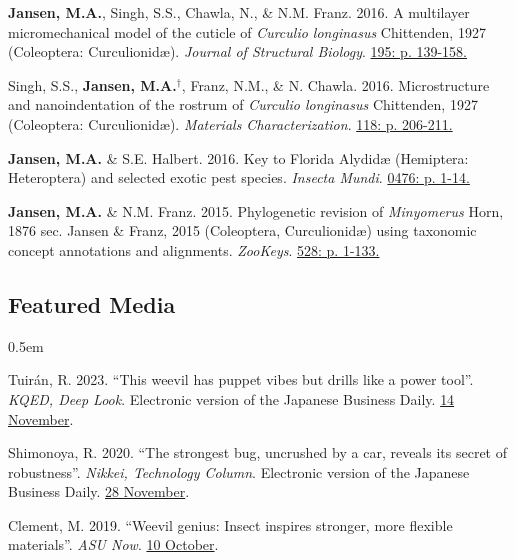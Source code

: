 \documentclass[12pt,a4paper]{article}
\begin{document}
\begin{description}
		\item \textbf{Jansen, M.A.}, Singh, S.S., Chawla, N., \& N.M. Franz. 2016. A multilayer micromechanical model of the cuticle of \textit{Curculio longinasus} Chittenden, 1927 (Coleoptera: Curculionid\ae). \textit{Journal of Structural Biology}. \href{http://www.sciencedirect.com/science/article/pii/S1047847716300922}{195: p. 139-158.}
		
		\item Singh, S.S., \textbf{Jansen, M.A.}$^\dagger$, Franz, N.M., \& N. Chawla. 2016. Microstructure and nanoindentation of the rostrum of \textit{Curculio longinasus} Chittenden, 1927 (Coleoptera: Curculionid\ae). \textit{Materials Characterization}. \href{http://www.sciencedirect.com/science/article/pii/S1044580316301619}{118: p. 206-211.}
		
		\item \textbf{Jansen, M.A.} \& S.E. Halbert. 2016. Key to Florida Alydid{\ae} (Hemiptera: Heteroptera) and selected exotic pest species. \textit{Insecta Mundi}. \href{http://journals.fcla.edu/mundi/article/view/87952/84644}{0476: p. 1-14.}
		
		\item \textbf{Jansen, M.A.} \& N.M. Franz. 2015. Phylogenetic revision of \textit{Minyomerus} Horn, 1876 sec. Jansen \& Franz, 2015 (Coleoptera, Curculionid\ae) using taxonomic concept annotations and alignments. \textit{ZooKeys}. \href{http://zookeys.pensoft.net/articles.php?id=6001}{528: p. 1-133.}
	\end{description}
	
	\subsection*{Featured Media}
	\begin{description}
		\itemsep0.5em
		\item Tuir\'{a}n, R. 2023. ``This weevil has puppet vibes but drills like a power tool''. \textit{KQED, Deep Look}. Electronic version of the Japanese Business Daily. \href{https://www.kqed.org/science/1985068/this-weevil-has-puppet-vibes-but-drills-like-a-power-tool}{14 November}.
		\item Shimonoya, R. 2020. ``The strongest bug, uncrushed by a car, reveals its secret of robustness''. \textit{Nikkei, Technology Column}. Electronic version of the Japanese Business Daily. \href{https://www.nikkei.com/article/DGXMZO66746060X21C20A1MY1000/}{28 November}.
		\item Clement, M. 2019. ``Weevil genius: Insect inspires stronger, more flexible materials''. \textit{ASU Now}. \href{https://asunow.asu.edu/20191010-discoveries-asu-engineering-weevil-inspires-stronger-flexible-materials}{10 October}.
		
	\end{description}
\end{document}
